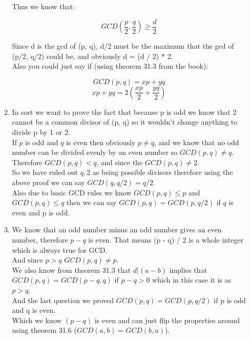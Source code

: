 \documentclass{article}
\begin{document}
\begin{enumerate}
\begin{enumerate}
        Thus we know that:

        \[GCD(\frac{p}{2},\frac{q}{2}) \geq \frac{d}{2}\]

        Since d is the gcd of (p, q), d/2 must be the maximum that the gcd of (p/2, q/2) could be, and obviously d = (d / 2) * 2. \\

        Also you could just say if (using theorem 31.3 from the book):

        \[GCD(p, q) = xp + yq\]
        \[xp + yq = 2(\frac{xp}{2} + \frac{yq}{2})\]

        \item In sort we want to prove the fact that because p is odd we know that 2 cannot be a common divisor of (p, q) so it wouldn't change anything to divide p by 1 or 2.\\
        
        If $p$ is odd and $q$ is even then obviously $p \neq q$,
        and we know that no odd number can be divided evenly by an even number so $GCD(p, q) \neq q$.\\

        Therefore $GCD(p, q) < q$, and since the $GCD(p, q) \neq 2$.\\

        So we have ruled out $q, 2$ as being possible divisors therefore using the above proof we can say $GCD(q, q/2) = q/2$.\\

        Also due to basic GCD rules we know $GCD(p, q) \leq p$ and $GCD(p, q) \leq q$ then we can say $GCD(p, q) = GCD(p, q/2)$ if $q$ is even and p is odd. 

        \item We know that an odd number minus an odd number gives an even number, therefore $p - q$ is even. That means (p - q) / 2 is a whole integer which is always true for GCD.\\
        
        And since $p > q$ $GCD(p, q) \neq p$.\\

        We also know from theorem 31.3 that $d | (a - b)$ implies that $GCD(p, q) = GCD(p - q, q)$ if $p - q > 0$ which in this case it is as $p > q$.\\

        And the last question we proved $GCD(p, q) = GCD(p, q / 2)$ if p is odd and q is even.\\

        Which we know $(p - q)$ is even and can just flip the properties around using theorem 31.6 ($GCD(a, b) = GCD(b, a)$).\\


\end{enumerate}
\end{enumerate}
\end{document}
